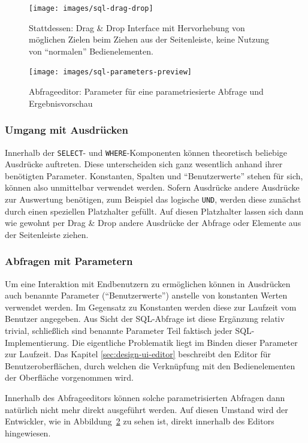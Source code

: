 \begin{figure}[h]
  \texttt{[image: images/sql-drag-drop]}
  \caption{Stattdessen: Drag \& Drop Interface mit Hervorhebung von möglichen Zielen beim Ziehen aus der Seitenleiste, keine Nutzung von "`normalen"' Bedienelementen.}
  \label{fig:screen-sql-editor-drag-drop}
\end{figure}
  
\begin{figure}[p]
  \texttt{[image: images/sql-parameters-preview]}
  \caption{Abfrageeditor: Parameter für eine parametriesierte Abfrage und Ergebnisvorschau}
  \label{fig:screen-sql-editor-parameters-preview}
\end{figure}

\subsubsection{Umgang mit Ausdrücken}

Innerhalb der \texttt{SELECT}- und \texttt{WHERE}-Komponenten können theoretisch beliebige Ausdrücke auftreten. Diese unterscheiden sich ganz wesentlich anhand ihrer benötigten Parameter. Konstanten, Spalten und "`Benutzerwerte"' stehen für sich, können also unmittelbar verwendet werden. Sofern Ausdrücke andere Ausdrücke zur Auswertung benötigen, zum Beispiel das logische \texttt{UND}, werden diese zunächst durch einen speziellen Platzhalter gefüllt. Auf diesen Platzhalter lassen sich dann wie gewohnt per Drag \& Drop andere Ausdrücke der Abfrage oder Elemente aus der Seitenleiste ziehen.

\subsubsection{Abfragen mit Parametern}
\label{sec:design-query-params}

Um eine Interaktion mit Endbenutzern zu ermöglichen können in Ausdrücken auch benannte Parameter ("`Benutzerwerte"') anstelle von konstanten Werten verwendet werden. Im Gegensatz zu Konstanten werden diese zur Laufzeit vom Benutzer angegeben. Aus Sicht der SQL-Abfrage ist diese Ergänzung relativ trivial, schließlich sind benannte Parameter Teil faktisch jeder SQL-Implementierung. Die eigentliche Problematik liegt im Binden dieser Parameter zur Laufzeit. Das Kapitel \ref{sec:design-ui-editor} beschreibt den Editor für Benutzeroberflächen, durch welchen die Verknüpfung mit den Bedienelementen der Oberfläche vorgenommen wird.

Innerhalb des Abfrageeditors können solche parametrisierten Abfragen dann natürlich nicht mehr direkt ausgeführt werden. Auf diesen Umstand wird der Entwickler, wie in Abbildung~\ref{fig:screen-sql-editor-parameters-preview} zu sehen ist, direkt innerhalb des Editors hingewiesen.

